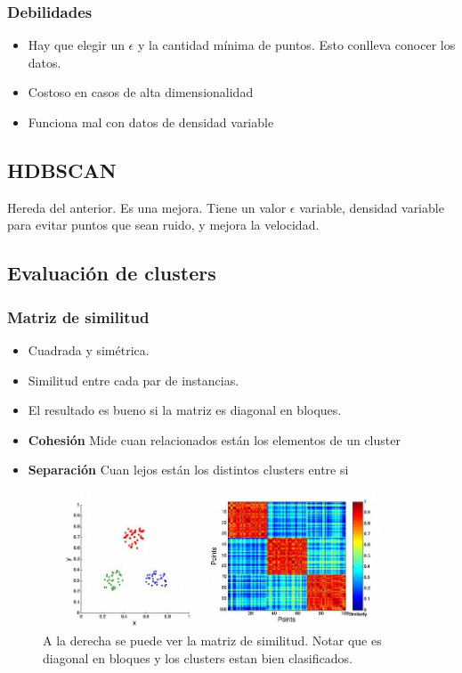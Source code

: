 \documentclass[titlepage,a4paper]{article}
\begin{document}
\subsubsection*{Debilidades}
\begin{itemize}
    \item Hay que elegir un $\epsilon$ y la cantidad mínima de puntos. Esto conlleva conocer los datos.
    \item Costoso en casos de alta dimensionalidad
    \item Funciona mal con datos de densidad variable
\end{itemize}

\subsection{HDBSCAN}
Hereda del anterior. Es una mejora. Tiene un valor $\epsilon$ variable, densidad variable para evitar puntos que sean ruido, y mejora la velocidad.

\subsection{Evaluación de clusters}

\subsubsection{Matriz de similitud}

\begin{itemize}
    \item Cuadrada y simétrica.
    \item Similitud entre cada par de instancias.
    \item El resultado es bueno si la matriz es diagonal en bloques.
    \item \textbf{Cohesión} Mide cuan relacionados están los elementos de un cluster
    \item \textbf{Separación} Cuan lejos están los distintos clusters entre si %
\end{itemize}

\begin{figure}[!htb]
    \centering
    \includegraphics[width=0.9\textwidth]{imagenesResumen/MatrizSimilitud.jpg}
    \caption{A la derecha se puede ver la matriz de similitud. Notar que es diagonal en bloques y los clusters estan bien clasificados.}
\end{figure}
\end{document}
